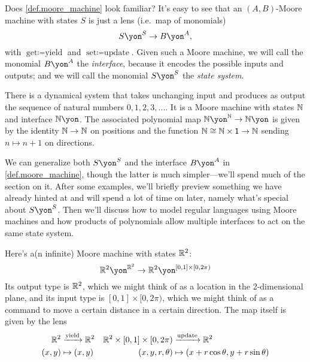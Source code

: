\documentclass[Book-Poly]{subfiles}
\begin{document}
Does \cref{def.moore_machine} look familiar?
It's easy to see that an $(A,B)$-Moore machine with states $S$ is just a lens (i.e.\ map of monomials)
\[
S\yon^S\to B\yon^A,
\]
with $\text{get} \coloneqq \text{yield}$ and $\text{set} \coloneqq \text{update}$.
Given such a Moore machine, we will call the monomial $B\yon^A$ the \emph{interface}, because it encodes the possible inputs and outputs; and we will call the monomial $S\yon^S$ the \emph{state system}.


\begin{example}\label{ex.counting_trajectory}
There is a dynamical system that takes unchanging input and produces as output the sequence of natural numbers $0,1,2,3,...$. It is a Moore machine with states $\mathbb{N}$ and interface $\nn\yon$. The associated polynomial map $\nn\yon^\nn\to\nn\yon$ is given by the identity $\mathbb{N} \to \mathbb{N}$ on positions and the function $\mathbb{N} \cong \mathbb{N} \times \textsf{1} \to \mathbb{N}$ sending $n\mapsto n+1$ on directions.
\end{example}

We can generalize both $S\yon^S$ and the interface $B\yon^A$ in \cref{def.moore_machine}, though the latter is much simpler---we'll spend much of the section on it. 
After some examples, we'll briefly preview something we have already hinted at and will spend a lot of time on later, namely what's special about $S\yon^S$.
Then we'll discuss how to model regular languages using Moore machines and how products of polynomials allow multiple interfaces to act on the same state system.

\begin{example}\label{ex.R2_moore}
Here's a(n infinite) Moore machine with states $\mathbb{R}^2$:
\[
\rr^2\yon^{\rr^2}\to\rr^2\yon^{[0,1]\times[0,2\pi)}%
\]
Its output type is $\mathbb{R}^2$, which we might think of as a location in the 2-dimensional plane, and its input type is $[0,1]\times[0,2\pi)$, which we might think of as a command to move a certain distance in a certain direction. The map itself is given by the lens
\begin{align}
  \mathbb{R}^2&\xrightarrow{\text{yield}}\mathbb{R}^2&
  \mathbb{R}^2\times[0,1]\times[0,2\pi)&\xrightarrow{\text{update}}\mathbb{R}^2
  	\nonumber\\\label{eqn.r2moore}
  (x,y)&\mapsto(x,y)&
  (x,y,r,\theta)&\mapsto(x+r\cos\theta, y+r\sin\theta)
\end{align}
\end{example}
\end{document}
